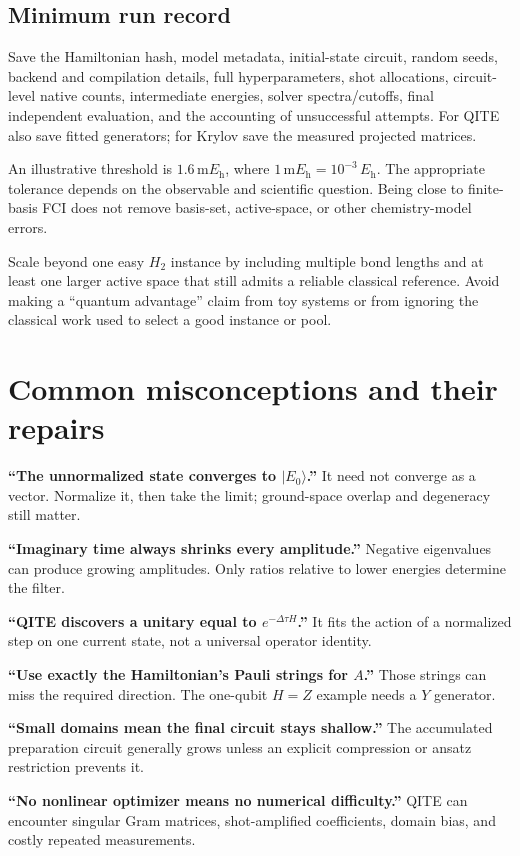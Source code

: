\documentclass[11pt,a4paper]{article}
\newcommand{\ket}[1]{\lvert #1\rangle}
\newcommand{\dt}{\Delta\tau}
\newcommand{\Eh}{E_{\mathrm h}}
\newcommand{\lesson}[2]{\clearpage\section{#1}\label{#2}}
\begin{document}
\subsection*{Minimum run record}
Save the Hamiltonian hash, model metadata, initial-state circuit, random seeds, backend and compilation details, full hyperparameters, shot allocations, circuit-level native counts, intermediate energies, solver spectra/cutoffs, final independent evaluation, and the accounting of unsuccessful attempts. For QITE also save fitted generators; for Krylov save the measured projected matrices.

\begin{idea}
An illustrative threshold is $1.6\,\mathrm{m}\Eh$, where $1\,\mathrm{m}\Eh=10^{-3}\,\Eh$. The appropriate tolerance depends on the observable and scientific question. Being close to finite-basis FCI does not remove basis-set, active-space, or other chemistry-model errors.
\end{idea}

Scale beyond one easy $H_2$ instance by including multiple bond lengths and at least one larger active space that still admits a reliable classical reference. Avoid making a ``quantum advantage'' claim from toy systems or from ignoring the classical work used to select a good instance or pool.

\lesson{Common misconceptions and their repairs}{sec:faq}
\textbf{``The unnormalized state converges to $\ket{E_0}$.''} It need not converge as a vector. Normalize it, then take the limit; ground-space overlap and degeneracy still matter.

\textbf{``Imaginary time always shrinks every amplitude.''} Negative eigenvalues can produce growing amplitudes. Only ratios relative to lower energies determine the filter.

\textbf{``QITE discovers a unitary equal to $e^{-\dt H}$.''} It fits the action of a normalized step on one current state, not a universal operator identity.

\textbf{``Use exactly the Hamiltonian's Pauli strings for $A$.''} Those strings can miss the required direction. The one-qubit $H=Z$ example needs a $Y$ generator.

\textbf{``Small domains mean the final circuit stays shallow.''} The accumulated preparation circuit generally grows unless an explicit compression or ansatz restriction prevents it.

\textbf{``No nonlinear optimizer means no numerical difficulty.''} QITE can encounter singular Gram matrices, shot-amplified coefficients, domain bias, and costly repeated measurements.
\end{document}

